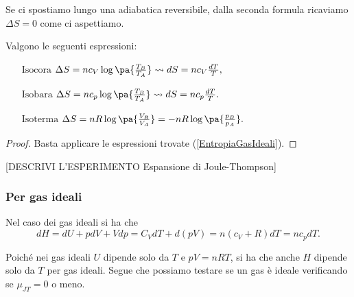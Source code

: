 \begin{remark}
Se ci spostiamo lungo una adiabatica reversibile, dalla seconda formula ricaviamo $\Delta S=0$ come ci aspettiamo.
\end{remark}

\begin{proposition}
Valgono le seguenti espressioni:

\begin{itemize}
\item[$\boxed{\text{Isocora}}$] $\Delta S=nc_V\log\pa{\frac{T_B}{T_A}}\leadsto dS=nc_V\frac{dT}T,$
\item[$\boxed{\text{Isobara}}$] $\Delta S=nc_p\log\pa{\frac{T_B}{T_A}}\leadsto dS=nc_p\frac{dT}T.$
\item[$\boxed{\text{Isoterma}}$] $\Delta S=nR\log\pa{\frac{V_B}{V_A}}=-nR\log\pa{\frac{p_B}{p_A}}.$
\end{itemize}
\end{proposition}
\begin{proof}
Basta applicare le espressioni trovate (\ref{EntropiaGasIdeali}).
\end{proof}

[DESCRIVI L'ESPERIMENTO Espansione di Joule-Thompson]

\subsubsection{Per gas ideali}
Nel caso dei gas ideali si ha che
\[dH=dU+pdV+Vdp=C_VdT+d(pV)=n(c_V+R)dT=nc_pdT.\]
\begin{remark}
Poich\'e nei gas ideali $U$ dipende solo da $T$ e $pV=nRT$, si ha che anche $H$ dipende solo da $T$ per gas ideali. Segue che possiamo testare se un gas \`e ideale verificando se $\mu_{JT}=0$ o meno.
\end{remark}












